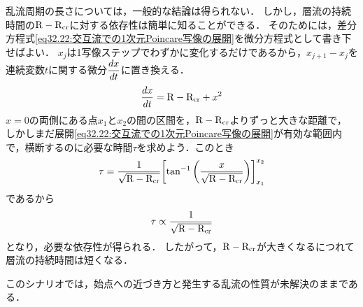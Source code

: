 乱流周期の長さについては，一般的な結論は得られない．
しかし，層流の持続時間の$\mathrm{R}-\mathrm{R}_{\mathrm{cr}}$に対する依存性は簡単に知ることができる．
そのためには，差分方程式\eqref{eq32.22:交互流での1次元Poincare写像の展開}を微分方程式として書き下せばよい．
$x_j$は1写像ステップでわずかに変化するだけであるから，$x_{j+1}-x_j$を連続変数$t$に関する微分$\ddv{x}{t}$に置き換える．
\begin{equation}
    \dv{x}{t} = \mathrm{R}-\mathrm{R}_{\mathrm{cr}} + x^2
\end{equation}
$x=0$の両側にある点$x_1$と$x_2$の間の区間を，$\mathrm{R}-\mathrm{R}_{\mathrm{cr}}$よりずっと大きな距離で，
しかしまだ展開\eqref{eq32.22:交互流での1次元Poincare写像の展開}が有効な範囲内で，横断するのに必要な時間$\tau$を求めよう．このとき
\[
    \tau = \frac{1}{\sqrt{\R-\Rcr}} \bqty{ \tan^{-1} \pqty{\frac{x}{\sqrt{\R-\Rcr}}} }_{x_1}^{x_2}
\]
であるから
\begin{equation}
    \tau \propto \frac{1}{\sqrt{\mathrm{R}-\mathrm{R}_{\mathrm{cr}}}}
\end{equation}
となり，必要な依存性が得られる．
したがって，$\mathrm{R}-\mathrm{R}_{\mathrm{cr}}$が大きくなるにつれて層流の持続時間は短くなる．



このシナリオでは，始点への近づき方と発生する乱流の性質が未解決のままである．



\BackToTheToc